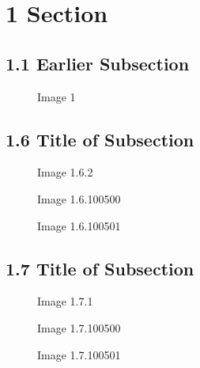 \section{1 Section}\label{section}

\subsection{1.1 Earlier Subsection}\label{earlier-subsection}

\begin{figure}
\centering
{}
\caption{Image 1}\label{fig:img1}
\end{figure}

\subsection{1.6 Title of Subsection}\label{title-of-subsection}

\begin{figure}
\centering
{}
\caption{Image 1.6.2}\label{fig:img2}
\end{figure}

\begin{figure}
\centering
{}
\caption{Image 1.6.100500}\label{fig:img3}
\end{figure}

\begin{figure}
\centering
{}
\caption{Image 1.6.100501}\label{fig:img4}
\end{figure}

\subsection{1.7 Title of Subsection}\label{title-of-subsection-1}

\begin{figure}
\centering
{}
\caption{Image 1.7.1}\label{fig:img21}
\end{figure}

\begin{figure}
\centering
{}
\caption{Image 1.7.100500}\label{fig:img31}
\end{figure}

\begin{figure}
\centering
{}
\caption{Image 1.7.100501}\label{fig:img41}
\end{figure}
